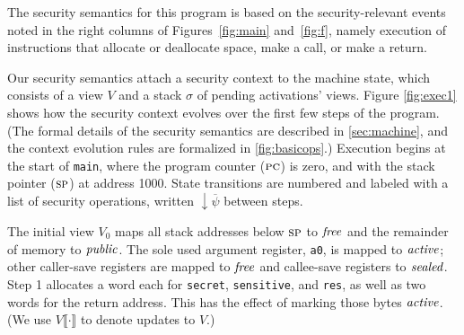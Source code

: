 \documentclass[10pt,conference]{ieeetran}%
\theoremstyle{definition}
\begin{document}
The security semantics for this program is based
on the security-relevant events noted in the right columns of Figures~\ref{fig:main}
and~\ref{fig:f}, namely execution of instructions that allocate or deallocate space,
make a call, or make a return.

Our security semantics attach a security context to the machine state,
which consists of a view \(V\) and a stack \(\sigma\) of pending activations' views.
Figure \ref{fig:exec1} shows how the security context evolves over the first few
steps of the program.  (The formal details of the security semantics are described in
\cref{sec:machine}, and the context evolution rules are formalized in \cref{fig:basicops}.)
Execution begins at the start of {\tt main}, where the program counter (\(\textsc{pc}\)) is zero,
and with the stack pointer (\(\textsc{sp}\)) at address 1000.
State transitions are numbered and labeled with a list of security operations, written
\(\downarrow \overline{\psi}\) between steps.

The initial view \(V_0\) maps all stack addresses below \(\textsc{sp}\) to \(\mathit{free}\) and the remainder of
memory to \(\mathit{public}\). The sole used argument register, {\tt a0}, is mapped to \(\mathit{active}\);
other caller-save registers are mapped to \(\mathit{free}\) and callee-save registers to \(\mathit{sealed}\).
Step 1 allocates a word each for {\tt secret}, {\tt sensitive}, and {\tt res}, as well
as two words for the return address. This has the
effect of marking those bytes \(\mathit{active}\).
(We use \(V\llbracket\cdot\rrbracket\) to denote updates to \(V\).)
%

\newcommand{\freebox}{\tikz \filldraw[fill=blue] (0,0) rectangle (10px,10px);}
\newcommand{\pubbox}{\tikz \filldraw[fill=lightgray] (0,0) rectangle (10px,10px);}
\newcommand{\objbox}{\tikz \filldraw[fill=yellow] (0,0) rectangle (10px,10px);}
\newcommand{\sealbox}{\tikz \filldraw[fill=red] (0,0) rectangle (10px,10px);}
\end{document}
